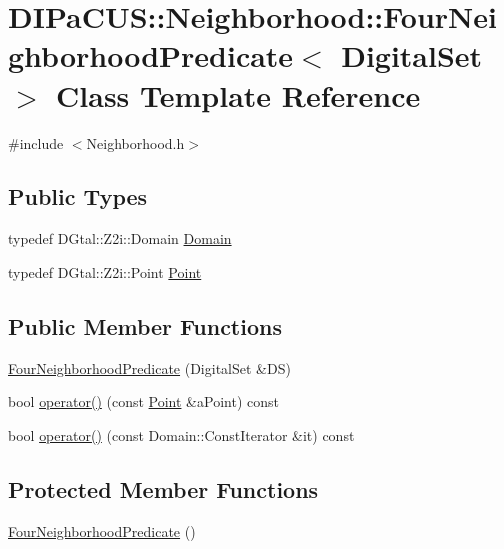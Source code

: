 \hypertarget{classDIPaCUS_1_1Neighborhood_1_1FourNeighborhoodPredicate}{}\section{D\+I\+Pa\+C\+US\+:\+:Neighborhood\+:\+:Four\+Neighborhood\+Predicate$<$ Digital\+Set $>$ Class Template Reference}
\label{classDIPaCUS_1_1Neighborhood_1_1FourNeighborhoodPredicate}


{\ttfamily \#include $<$Neighborhood.\+h$>$}

\subsection*{Public Types}
\begin{DoxyCompactItemize}
\item 
typedef D\+Gtal\+::\+Z2i\+::\+Domain \mbox{\hyperlink{classDIPaCUS_1_1Neighborhood_1_1FourNeighborhoodPredicate_acf2e866035c770ff120fa4ef6ee841f2}{Domain}}
\item 
typedef D\+Gtal\+::\+Z2i\+::\+Point \mbox{\hyperlink{classDIPaCUS_1_1Neighborhood_1_1FourNeighborhoodPredicate_abc0e0bbbb71884290b4b61935c296230}{Point}}
\end{DoxyCompactItemize}
\subsection*{Public Member Functions}
\begin{DoxyCompactItemize}
\item 
\mbox{\hyperlink{classDIPaCUS_1_1Neighborhood_1_1FourNeighborhoodPredicate_ae0b8d8d5448bfaf05083d71fb19aeeca}{Four\+Neighborhood\+Predicate}} (Digital\+Set \&DS)
\item 
bool \mbox{\hyperlink{classDIPaCUS_1_1Neighborhood_1_1FourNeighborhoodPredicate_a035980ee392a3565d219e6f3c8229af9}{operator()}} (const \mbox{\hyperlink{classDIPaCUS_1_1Neighborhood_1_1FourNeighborhoodPredicate_abc0e0bbbb71884290b4b61935c296230}{Point}} \&a\+Point) const
\item 
bool \mbox{\hyperlink{classDIPaCUS_1_1Neighborhood_1_1FourNeighborhoodPredicate_ad80184ab4abda5e6b38734c6fd007ae9}{operator()}} (const Domain\+::\+Const\+Iterator \&it) const
\end{DoxyCompactItemize}
\subsection*{Protected Member Functions}
\begin{DoxyCompactItemize}
\item 
\mbox{\hyperlink{classDIPaCUS_1_1Neighborhood_1_1FourNeighborhoodPredicate_a7dc107e1ed2f9aaf59d4d0a76d266feb}{Four\+Neighborhood\+Predicate}} ()
\end{DoxyCompactItemize}


